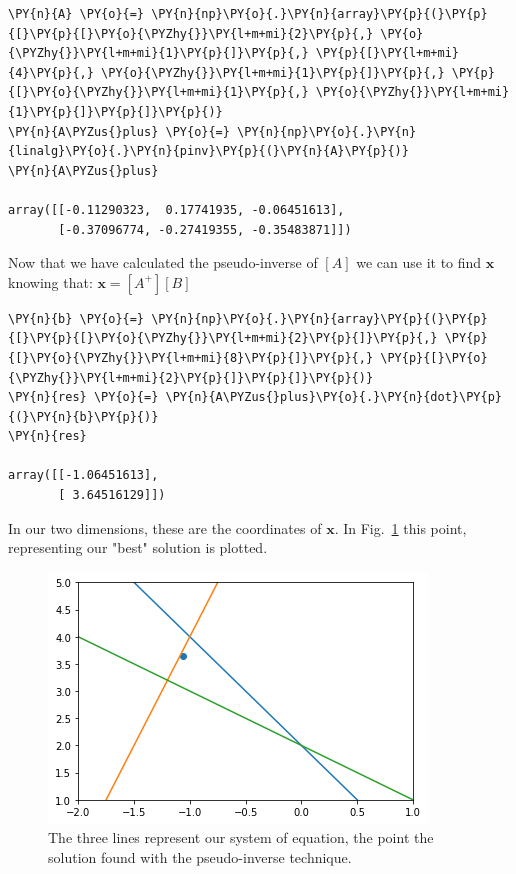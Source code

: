 \begin{tcolorbox}[breakable, size=fbox, boxrule=1pt, pad at break*=1mm,colback=cellbackground, colframe=cellborder]
\begin{Verbatim}[commandchars=\\\{\}]
\PY{n}{A} \PY{o}{=} \PY{n}{np}\PY{o}{.}\PY{n}{array}\PY{p}{(}\PY{p}{[}\PY{p}{[}\PY{o}{\PYZhy{}}\PY{l+m+mi}{2}\PY{p}{,} \PY{o}{\PYZhy{}}\PY{l+m+mi}{1}\PY{p}{]}\PY{p}{,} \PY{p}{[}\PY{l+m+mi}{4}\PY{p}{,} \PY{o}{\PYZhy{}}\PY{l+m+mi}{1}\PY{p}{]}\PY{p}{,} \PY{p}{[}\PY{o}{\PYZhy{}}\PY{l+m+mi}{1}\PY{p}{,} \PY{o}{\PYZhy{}}\PY{l+m+mi}{1}\PY{p}{]}\PY{p}{]}\PY{p}{)}
\PY{n}{A\PYZus{}plus} \PY{o}{=} \PY{n}{np}\PY{o}{.}\PY{n}{linalg}\PY{o}{.}\PY{n}{pinv}\PY{p}{(}\PY{n}{A}\PY{p}{)}
\PY{n}{A\PYZus{}plus}
	
array([[-0.11290323,  0.17741935, -0.06451613],
       [-0.37096774, -0.27419355, -0.35483871]])
\end{Verbatim}
\end{tcolorbox}

Now that we have calculated the pseudo-inverse of \([A]\) we can use it
to find \(\mathbf{x}\) knowing that: \(\mathbf{x}=[A^+] [B]\)

\begin{tcolorbox}[breakable, size=fbox, boxrule=1pt, pad at break*=1mm,colback=cellbackground, colframe=cellborder]
\begin{Verbatim}[commandchars=\\\{\}]
\PY{n}{b} \PY{o}{=} \PY{n}{np}\PY{o}{.}\PY{n}{array}\PY{p}{(}\PY{p}{[}\PY{p}{[}\PY{o}{\PYZhy{}}\PY{l+m+mi}{2}\PY{p}{]}\PY{p}{,} \PY{p}{[}\PY{o}{\PYZhy{}}\PY{l+m+mi}{8}\PY{p}{]}\PY{p}{,} \PY{p}{[}\PY{o}{\PYZhy{}}\PY{l+m+mi}{2}\PY{p}{]}\PY{p}{]}\PY{p}{)}
\PY{n}{res} \PY{o}{=} \PY{n}{A\PYZus{}plus}\PY{o}{.}\PY{n}{dot}\PY{p}{(}\PY{n}{b}\PY{p}{)}
\PY{n}{res}
	
array([[-1.06451613],
       [ 3.64516129]])
\end{Verbatim}
\end{tcolorbox}

In our two dimensions, these are the coordinates of \(\mathbf{x}\). 
In Fig.~\ref{fig:overdet_system} this point, representing our "best" 
solution is plotted.

\begin{figure}[htb]
	\centering
	\includegraphics[width=0.7\linewidth]{figures/overdet_system}
	\caption{The three lines represent our system of equation, the point 
		the solution found with the pseudo-inverse technique.}
	\label{fig:overdet_system}
\end{figure}

